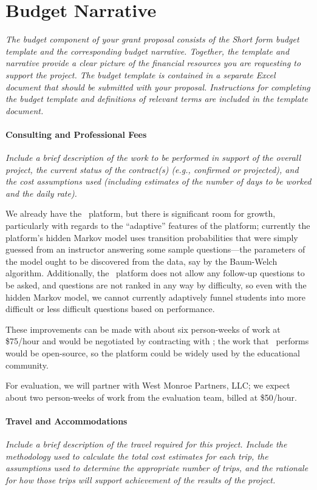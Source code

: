\section{Budget Narrative}

\textsl{The budget component of your grant proposal consists of the
  Short form budget template and the corresponding budget
  narrative. Together, the template and narrative provide a clear
  picture of the financial resources you are requesting to support the
  project. The budget template is contained in a separate Excel
  document that should be submitted with your proposal. Instructions
  for completing the budget template and definitions of relevant terms
  are included in the template document.}

\paragraph{Consulting and Professional Fees}
\textsl{Include a brief description of the work to be performed in
  support of the overall project, the current status of the
  contract(s) (e.g., confirmed or projected), and the cost assumptions
  used (including estimates of the number of days to be worked and the
  daily rate).}

We already have the \mooculus\ platform, but there is significant room
for growth, particularly with regards to the ``adaptive'' features of
the platform; currently the platform's hidden Markov model uses
transition probabilities that were simply guessed from an instructor
answering some sample questions---the parameters of the model ought to
be discovered from the data, say by the Baum-Welch algorithm.
Additionally, the \mooculus\ platform does not allow any follow-up
questions to be asked, and questions are not ranked in any way by
difficulty, so even with the hidden Markov model, we cannot currently
adaptively funnel students into more difficult or less difficult
questions based on performance.

These improvements can be made with about six person-weeks of work at
\$75/hour and would be negotiated by contracting with \gratisu; the
work that \gratisu\ performs would be open-source, so the platform
could be widely used by the educational community.

For evaluation, we will partner with West Monroe Partners, LLC; we
expect about two person-weeks of work from the evaluation team, billed
at \$50/hour.

\paragraph{Travel and Accommodations}
\textsl{Include a brief description of the travel required for this
  project.  Include the methodology used to calculate the total cost
  estimates for each trip, the assumptions used to determine the
  appropriate number of trips, and the rationale for how those trips
  will support achievement of the results of the project.}

